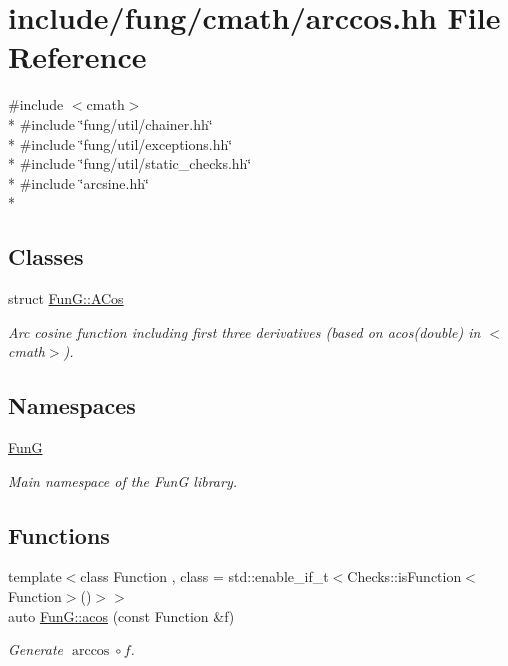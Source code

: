 \hypertarget{cmath_2arccos_8hh}{\section{include/fung/cmath/arccos.hh File Reference}
\label{cmath_2arccos_8hh}
}
{\ttfamily \#include $<$cmath$>$}\\*
{\ttfamily \#include \char`\"{}fung/util/chainer.\-hh\char`\"{}}\\*
{\ttfamily \#include \char`\"{}fung/util/exceptions.\-hh\char`\"{}}\\*
{\ttfamily \#include \char`\"{}fung/util/static\-\_\-checks.\-hh\char`\"{}}\\*
{\ttfamily \#include \char`\"{}arcsine.\-hh\char`\"{}}\\*
\subsection*{Classes}
\begin{DoxyCompactItemize}
\item 
struct \hyperlink{structFunG_1_1ACos}{Fun\-G\-::\-A\-Cos}
\begin{DoxyCompactList}\small\item\em Arc cosine function including first three derivatives (based on acos(double) in $<$cmath$>$). \end{DoxyCompactList}\end{DoxyCompactItemize}
\subsection*{Namespaces}
\begin{DoxyCompactItemize}
\item 
\hyperlink{namespaceFunG}{Fun\-G}
\begin{DoxyCompactList}\small\item\em Main namespace of the Fun\-G library. \end{DoxyCompactList}\end{DoxyCompactItemize}
\subsection*{Functions}
\begin{DoxyCompactItemize}
\item 
{\footnotesize template$<$class Function , class  = std\-::enable\-\_\-if\-\_\-t$<$\-Checks\-::is\-Function$<$\-Function$>$()$>$$>$ }\\auto \hyperlink{group__CMathGroup_gae9b7d3a479bcd8d48cf25f1c29edefb9}{Fun\-G\-::acos} (const Function \&f)
\begin{DoxyCompactList}\small\item\em Generate $ \arccos\circ f $. \end{DoxyCompactList}\end{DoxyCompactItemize}
